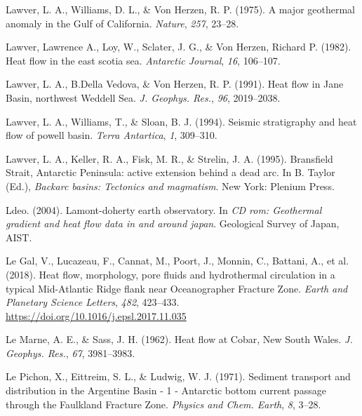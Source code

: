 \documentclass[draft,linenumbers]{agujournal2018}
\begin{document}
\leavevmode{}%
Lawver, L. A., Williams, D. L., \& Von Herzen, R. P. (1975). A major
geothermal anomaly in the {Gulf of California}. \emph{Nature},
\emph{257}, 23--28.

\leavevmode{}%
Lawver, Lawrence A., Loy, W., Sclater, J. G., \& Von Herzen, Richard P.
(1982). Heat flow in the east scotia sea. \emph{Antarctic Journal},
\emph{16}, 106--107.

\leavevmode{}%
Lawver, L. A., B.Della Vedova, \& Von Herzen, R. P. (1991). Heat flow in
{Jane Basin}, northwest {Weddell Sea}. \emph{J. Geophys. Res.},
\emph{96}, 2019--2038.

\leavevmode{}%
Lawver, L. A., Williams, T., \& Sloan, B. J. (1994). Seismic
stratigraphy and heat flow of powell basin. \emph{Terra Antartica},
\emph{1}, 309--310.

\leavevmode{}%
Lawver, L. A., Keller, R. A., Fisk, M. R., \& Strelin, J. A. (1995).
{Bransfield Strait, Antarctic Peninsula: active extension behind a dead
arc}. In B. Taylor (Ed.), \emph{Backarc basins: Tectonics and
magmatism}. New York: Plenium Press.

\leavevmode{}%
Ldeo. (2004). Lamont-doherty earth observatory. In \emph{CD rom:
Geothermal gradient and heat flow data in and around japan}. Geological
Survey of Japan, AIST.

\leavevmode{}%
Le Gal, V., Lucazeau, F., Cannat, M., Poort, J., Monnin, C., Battani,
A., et al. (2018). Heat flow, morphology, pore fluids and hydrothermal
circulation in a typical {Mid-Atlantic Ridge} flank near {Oceanographer
Fracture Zone}. \emph{Earth and Planetary Science Letters}, \emph{482},
423--433. \url{https://doi.org/10.1016/j.epsl.2017.11.035}

\leavevmode{}%
Le Marne, A. E., \& Sass, J. H. (1962). Heat flow at {Cobar, New South
Wales}. \emph{J. Geophys. Res.}, \emph{67}, 3981--3983.

\leavevmode{}%
Le Pichon, X., Eittreim, S. L., \& Ludwig, W. J. (1971). Sediment
transport and distribution in the {Argentine Basin} - 1 - {Antarctic}
bottom current passage through the {Faulkland Fracture Zone}.
\emph{Physics and Chem. Earth}, \emph{8}, 3--28.
\end{document}
